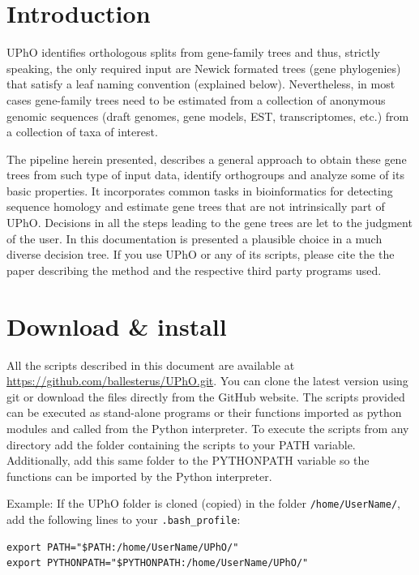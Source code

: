 \documentclass[10pt]{article}
\begin{document}
\clearpage

\tableofcontents
\section{Introduction} UPhO identifies orthologous splits from
gene-family trees and thus, strictly speaking, the only required input
are Newick formated trees (gene phylogenies) that satisfy a leaf naming
convention (explained below). Nevertheless, in most cases gene-family
trees need to be estimated from a collection of anonymous genomic
sequences (draft genomes, gene models, EST, transcriptomes, etc.) from
a collection of taxa of interest.

The pipeline herein presented, describes a general approach to obtain
these gene trees from such type of input data, identify orthogroups and
analyze some of its basic properties. It incorporates common tasks in
bioinformatics for detecting sequence homology and estimate gene trees
that are not intrinsically part of UPhO. Decisions in all the steps
leading to the gene trees are let to the  judgment of the user. In this
documentation is presented a plausible choice in a much diverse
decision tree. If you use UPhO or any of its scripts, please cite the
the paper describing the method \citep{Ballesteros2016} and the respective 
third party programs used.

\section{Download \& install} All the scripts described in this
document are available at
\url{https://github.com/ballesterus/UPhO.git}. You can clone the
latest version using git or download the files directly from the
GitHub website.  The scripts provided can be executed as stand-alone
programs or their functions imported as python modules and called from
the Python interpreter.  To execute the scripts from any directory add
the folder containing the scripts to your PATH variable. Additionally,
add this same folder to the PYTHONPATH variable so the functions can
be imported by the Python interpreter.

Example: If the UPhO folder is cloned (copied) in the folder
\texttt{/home/UserName/}, add the following
lines to your \texttt{.bash\_profile}:
 
\begin{verbatim} 
export PATH="$PATH:/home/UserName/UPhO/" 
export PYTHONPATH="$PYTHONPATH:/home/UserName/UPhO/"
\end{verbatim}
\end{document}
